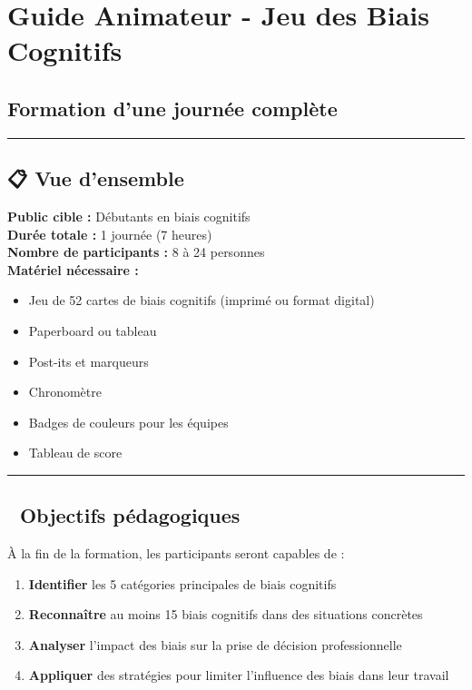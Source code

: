 \documentclass[
]{article}
\author{}
\date{\vspace{-2.5em}}
\providecommand{\tightlist}{%
  \setlength{\itemsep}{0pt}\setlength{\parskip}{0pt}}
\begin{document}
\section{Guide Animateur - Jeu des Biais
Cognitifs}\label{guide-animateur---jeu-des-biais-cognitifs}

\subsection{Formation d'une journée
complète}\label{formation-dune-journuxe9e-compluxe8te}

\begin{center}\rule{0.5\linewidth}{0.5pt}\end{center}

\subsection{📋 Vue d'ensemble}\label{vue-densemble}

\textbf{Public cible :} Débutants en biais cognitifs\\
\textbf{Durée totale :} 1 journée (7 heures)\\
\textbf{Nombre de participants :} 8 à 24 personnes\\
\textbf{Matériel nécessaire :}

\begin{itemize}
\tightlist
\item
  Jeu de 52 cartes de biais cognitifs (imprimé ou format digital)
\item
  Paperboard ou tableau
\item
  Post-its et marqueurs
\item
  Chronomètre
\item
  Badges de couleurs pour les équipes
\item
  Tableau de score
\end{itemize}

\begin{center}\rule{0.5\linewidth}{0.5pt}\end{center}

\subsection{🎯 Objectifs pédagogiques}\label{objectifs-puxe9dagogiques}

À la fin de la formation, les participants seront capables de :

\begin{enumerate}
\def\labelenumi{\arabic{enumi}.}
\tightlist
\item
  \textbf{Identifier} les 5 catégories principales de biais cognitifs
\item
  \textbf{Reconnaître} au moins 15 biais cognitifs dans des situations
  concrètes
\item
  \textbf{Analyser} l'impact des biais sur la prise de décision
  professionnelle
\item
  \textbf{Appliquer} des stratégies pour limiter l'influence des biais
  dans leur travail
\end{enumerate}
\end{document}
